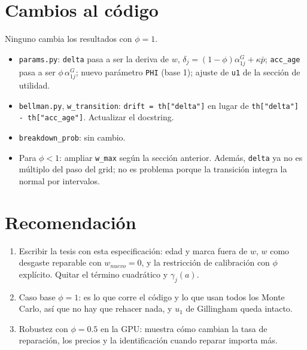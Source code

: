 \documentclass{article}
\begin{document}
\section{Cambios al código}

Ninguno cambia los resultados con $\phi=1$.
\begin{itemize}
    \item \texttt{params.py}: \texttt{delta} pasa a ser la deriva de $w$, $\delta_j=(1-\phi)\alpha^G_{1j}+\kappa\bar{p}$; \texttt{acc\_age} pasa a ser $\phi\,\alpha^G_{1j}$; nuevo parámetro \texttt{PHI} (base 1); ajuste de \texttt{u1} de la sección de utilidad.
    \item \texttt{bellman.py}, \texttt{w\_transition}: \texttt{drift = th["delta"]} en lugar de \texttt{th["delta"] - th["acc\_age"]}. Actualizar el docstring.
    \item \texttt{breakdown\_prob}: sin cambio.
    \item Para $\phi<1$: ampliar \texttt{w\_max} según la sección anterior. Además, \texttt{delta} ya no es múltiplo del paso del grid; no es problema porque la transición integra la normal por intervalos.
\end{itemize}

\section{Recomendación}

\begin{enumerate}
    \item Escribir la tesis con esta especificación: edad y marca fuera de $w$, $w$ como desgaste reparable con $w_{nuevo}=0$, y la restricción de calibración con $\phi$ explícito. Quitar el término cuadrático y $\gamma_j(a)$.
    \item Caso base $\phi=1$: es lo que corre el código y lo que usan todos los Monte Carlo, así que no hay que rehacer nada, y $u_1$ de Gillingham queda intacto.
    \item Robustez con $\phi=0.5$ en la GPU: muestra cómo cambian la tasa de reparación, los precios y la identificación cuando reparar importa más.
\end{enumerate}
\end{document}
